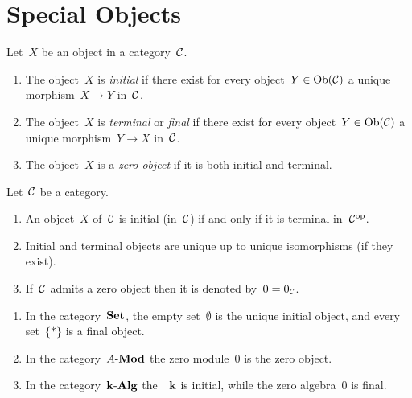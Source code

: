 \section{Special Objects}


\begin{definition}
  Let~$X$ be an object in a category~$\mathcal{C}$.
  \begin{enumerate}
    \item
      The object~$X$ is \emph{initial} if there exist for every object~$Y \in \operatorname{Ob}(\mathcal{C})$ a unique morphism~$X \to Y$ in~$\mathcal{C}$.
    \item
      The object~$X$ is \emph{terminal} or \emph{final} if there exist for every object~$Y \in \operatorname{Ob}(\mathcal{C})$ a unique morphism~$Y \to X$ in~$\mathcal{C}$.
    \item
      The object~$X$ is a \emph{zero object} if it is both initial and terminal.
  \end{enumerate}
\end{definition}


\begin{remark}
  Let~$\mathcal{C}$ be a category.
  \begin{enumerate}
    \item
      An object~$X$ of~$\mathcal{C}$ is initial (in~$\mathcal{C}$) if and only if it is terminal in~$\mathcal{C}^{\mathrm{op}}$.
    \item
      Initial and terminal objects are unique up to unique isomorphisms (if they exist).
    \item
      If~$\mathcal{C}$ admits a zero object then it is denoted by~$0 = 0_{\mathcal{C}}$.
  \end{enumerate}
\end{remark}


\begin{example}
  \leavevmode
  \begin{enumerate}
    \item
      In the category~$\mathbf{Set}$, the empty set~$\emptyset$ is the unique initial object, and every  set~$\{\ast\}$ is a final object.
    \item
      In the category~$\text{$A$-$\mathbf{Mod}$}$ the zero module~$0$ is the zero object.
    \item
      In the category~$\text{$\mathbf{k}$-$\mathbf{Alg}$}$ the~{\kalg}~$\mathbf{k}$ is initial, while the zero algebra~$0$ is final.
  \end{enumerate}
\end{example}


